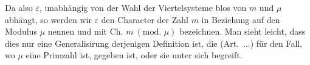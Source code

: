 Da also $\varepsilon$, unabhängig von der Wahl der Viertelsysteme blos von $m$ und $\mu$ abhängt, so werden wir $\varepsilon$ den Character der Zahl $m$ in Beziehung auf den Modulus $\mu$ nennen und mit $\text{Ch. }m\ (\text{mod. }\mu)$ bezeichnen. Man sieht leicht, dass dies nur eine Generalisirung derjenigen Definition ist, die (Art.\ $\ldots$) für den Fall, wo $\mu$ eine Primzahl ist, gegeben ist, oder sie unter sich begreift.
